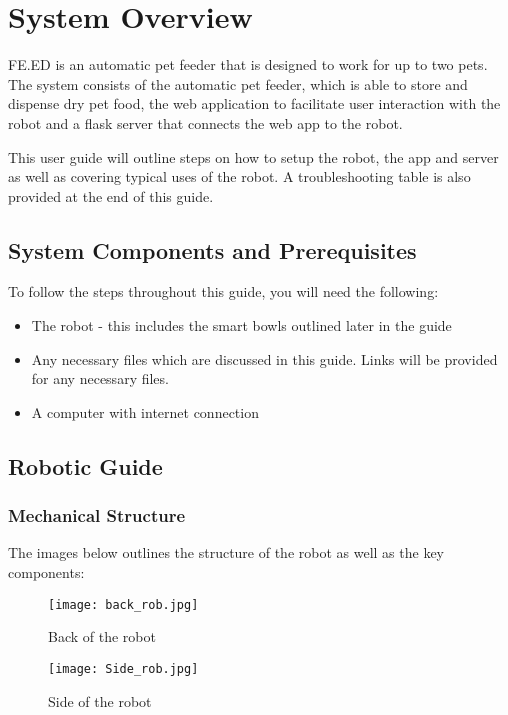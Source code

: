 \section{System Overview}
FE.ED is an automatic pet feeder that is designed to work for up to two pets. The system consists of the automatic pet feeder, which is able to store and dispense dry pet food, the web application to facilitate user interaction with the robot and a flask server that connects the web app to the robot.

This user guide will outline steps on how to setup the robot, the app and server as well as covering typical uses of the robot. A troubleshooting table is also provided at the end of this guide.



    \subsection{System Components and Prerequisites}
       To follow the steps throughout this guide, you will need the following:
       \begin{itemize}
           \item The robot - this includes the smart bowls outlined later in the guide
           \item Any necessary files which are discussed in this guide. Links will be provided for any necessary files.
           \item A computer with internet connection
       \end{itemize}
    \subsection{Robotic Guide}
    
        \subsubsection{Mechanical Structure}
        The images below outlines the structure of the robot as well as the key components:
        \begin{figure}[h]
        \centering
        \texttt{[image: back\_rob.jpg]}
         \caption{Back of the robot}
        \end{figure}
        
        \newpage
        
        \begin{figure}[h]
        \centering
        \texttt{[image: Side\_rob.jpg]}
         \caption{Side of the robot}
        \end{figure}
        
